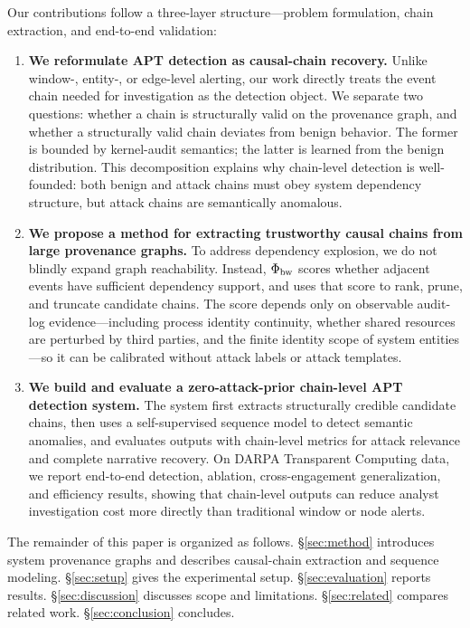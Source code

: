Our contributions follow a three-layer structure---problem formulation, chain extraction, and end-to-end validation:
\begin{enumerate}
\item \textbf{We reformulate APT detection as causal-chain recovery.} Unlike window-, entity-, or edge-level alerting, our work directly treats the event chain needed for investigation as the detection object. We separate two questions: whether a chain is structurally valid on the provenance graph, and whether a structurally valid chain deviates from benign behavior. The former is bounded by kernel-audit semantics; the latter is learned from the benign distribution. This decomposition explains why chain-level detection is well-founded: both benign and attack chains must obey system dependency structure, but attack chains are semantically anomalous.
\item \textbf{We propose a method for extracting trustworthy causal chains from large provenance graphs.} To address dependency explosion, we do not blindly expand graph reachability. Instead, $\Phi_{\text{bw}}$ scores whether adjacent events have sufficient dependency support, and uses that score to rank, prune, and truncate candidate chains. The score depends only on observable audit-log evidence---including process identity continuity, whether shared resources are perturbed by third parties, and the finite identity scope of system entities---so it can be calibrated without attack labels or attack templates.
\item \textbf{We build and evaluate a zero-attack-prior chain-level APT detection system.} The system first extracts structurally credible candidate chains, then uses a self-supervised sequence model to detect semantic anomalies, and evaluates outputs with chain-level metrics for attack relevance and complete narrative recovery. On DARPA Transparent Computing data, we report end-to-end detection, ablation, cross-engagement generalization, and efficiency results, showing that chain-level outputs can reduce analyst investigation cost more directly than traditional window or node alerts.
\end{enumerate}

The remainder of this paper is organized as follows. \S\ref{sec:method} introduces system provenance graphs and describes causal-chain extraction and sequence modeling. \S\ref{sec:setup} gives the experimental setup. \S\ref{sec:evaluation} reports results. \S\ref{sec:discussion} discusses scope and limitations. \S\ref{sec:related} compares related work. \S\ref{sec:conclusion} concludes.
